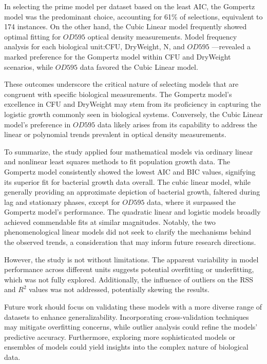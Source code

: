 \documentclass[11pt]{article}
\begin{document}
In selecting the prime model per dataset based on the least AIC, the Gompertz model was the predominant choice, accounting for 61\% of selections, equivalent to 174 instances. On the other hand, the Cubic Linear model frequently showed optimal fitting for $OD595$ optical density measurements. Model frequency analysis for each biological unit:CFU, DryWeight, N, and $OD595$ —revealed a marked preference for the Gompertz model within CFU and DryWeight scenarios, while $OD595$ data favored the Cubic Linear model.\cite{kruger_2009}

These outcomes underscore the critical nature of selecting models that are congruent with specific biological measurements. The Gompertz model's excellence in CFU and DryWeight may stem from its proficiency in capturing the logistic growth commonly seen in biological systems. \cite{kruger_2009} Conversely, the Cubic Linear model's preference in $OD595$ data likely arises from its capability to address the linear or polynomial trends prevalent in optical density measurements. \cite{bradford_1976_protein}

To summarize, the study applied four mathematical models via ordinary linear and nonlinear least squares methods to fit population growth data. The Gompertz model consistently showed the lowest AIC and BIC values, signifying its superior fit for bacterial growth data overall. The cubic linear model, while generally providing an approximate depiction of bacterial growth, faltered during lag and stationary phases, except for $OD595$ data, where it surpassed the Gompertz model's performance. The quadratic linear and logistic models broadly achieved commendable fits at similar magnitudes. Notably, the two phenomenological linear models did not seek to clarify the mechanisms behind the observed trends, a consideration that may inform future research directions.

However, the study is not without limitations. The apparent variability in model performance across different units suggests potential overfitting or underfitting, which was not fully explored. Additionally, the influence of outliers on the RSS and $R^2$ values was not addressed, potentially skewing the results.

Future work should focus on validating these models with a more diverse range of datasets to enhance generalizability. Incorporating cross-validation techniques may mitigate overfitting concerns, while outlier analysis could refine the models' predictive accuracy. Furthermore, exploring more sophisticated models or ensembles of models could yield insights into the complex nature of biological data.




\end{document}
